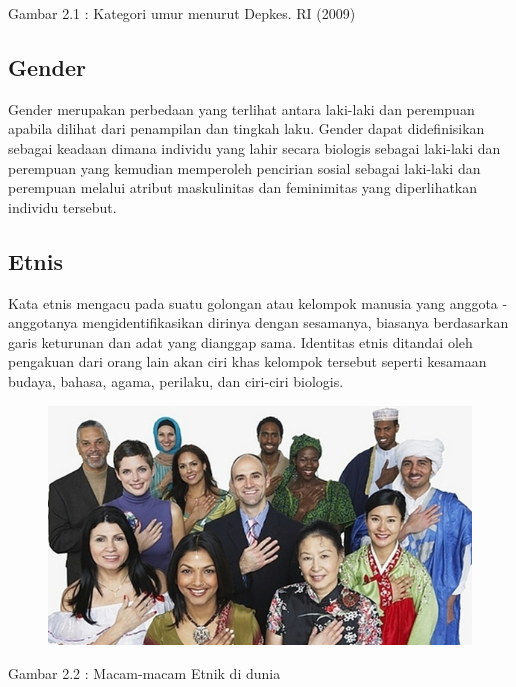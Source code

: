 \begin{center}
    Gambar 2.1 : Kategori umur menurut Depkes. RI (2009)
\end{center}

\subsection{Gender}
Gender merupakan perbedaan yang terlihat antara laki-laki dan perempuan apabila dilihat dari penampilan 
dan tingkah laku. Gender dapat didefinisikan sebagai keadaan dimana individu yang lahir secara biologis 
sebagai laki-laki dan perempuan yang kemudian memperoleh pencirian sosial sebagai laki-laki dan perempuan 
melalui atribut maskulinitas dan feminimitas yang diperlihatkan individu tersebut\citep{LanguageGender}.

\subsection{Etnis}
Kata etnis mengacu pada suatu golongan atau kelompok manusia yang anggota - anggotanya mengidentifikasikan 
dirinya dengan sesamanya, biasanya berdasarkan garis keturunan dan adat yang dianggap sama. Identitas 
etnis ditandai oleh pengakuan dari orang lain akan ciri khas kelompok tersebut seperti kesamaan budaya, 
bahasa, agama, perilaku, dan ciri-ciri biologis\citep{Ethnicity}.
\begin{figure} [H] \centering
    \includegraphics[scale=0.6]{gambar/etnik.png}
    \label{fig:Etnik}
\end{figure}

\begin{center}
    Gambar 2.2 : Macam-macam Etnik di dunia
\end{center}

